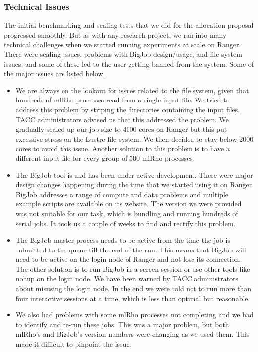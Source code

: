 \documentclass{sig-alternate}
\begin{document}
\subsubsection{Technical Issues }

The initial benchmarking and scaling tests that we did for the allocation proposal progressed smoothly. But as with any research project, we ran into many technical challenges when we started running experiments at scale on Ranger. There were scaling issues, problems with BigJob design/usage, and file system issues, and some of these led to the user getting banned from the system. Some of the major issues are listed below. 
\begin{itemize}
\item We are always on the lookout for issues related to the file system, given that hundreds of mlRho processes read from a single input file. We tried to address this problem by striping the directories containing the input files. TACC administrators advised us that this addressed the problem. We gradually scaled up our job size to 4000 cores on Ranger but this put excessive stress on the Lustre file system. We then decided to stay below 2000 cores to avoid this issue. Another solution to this problem is to have a different input file for every group of 500 mlRho processes. 

  \item The BigJob tool is and has been under active development. There were major design changes happening during the time that we started using it on Ranger. BigJob addresses a range of compute and data problems and multiple example scripts are available on its website. The version we were provided was not suitable for our task, which is bundling and running hundreds of serial jobs. It took us a couple of weeks to find and rectify this problem. 
\item The BigJob master process needs to be active from the time the job is submitted to the queue till the end of the run. This means that BigJob will need to be active on the login node of Ranger and not lose its connection. The other solution is to run BigJob in a screen session or use other tools like nohup on the login node. We have been warned by TACC administrators about misusing the login node. In the end we were told not to run more than four interactive sessions at a time, which is less than optimal but reasonable. 
  \item We also had problems with some mlRho processes not completing and we had to identify and re-run these jobs. This was a major problem, but both mlRho's and BigJob's version numbers were changing as we used them. This made it difficult to pinpoint the issue. 

\end{itemize}
\end{document}
